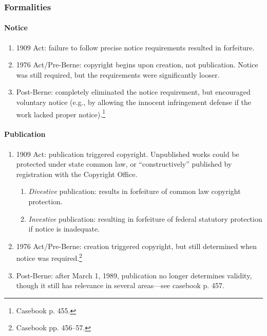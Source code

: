 \subsubsection{Formalities}

\paragraph{Notice}

\begin{enumerate}
    \item 1909 Act: failure to follow precise notice requirements resulted in 
    forfeiture.
    \item 1976 Act/Pre-Berne: copyright begins upon creation, not 
    publication. Notice was still required, but the requirements were 
    significantly looser.
    \item Post-Berne: completely eliminated the notice requirement, but 
    encouraged voluntary notice (e.g., by allowing the innocent infringement 
    defense if the work lacked proper notice).\footnote{Casebook p. 455.}
\end{enumerate}

\paragraph{Publication}

\begin{enumerate}
    \item 1909 Act: publication triggered copyright. Unpublished works could 
    be protected under state common law, or ``constructively'' published by 
    registration with the Copyright Office.
    \begin{enumerate}
        \item \emph{Divestive} publication: results in forfeiture of common 
        law copyright protection. 
        \item \emph{Investive} publication: resulting in forfeiture of federal 
        statutory protection if notice is inadequate.
    \end{enumerate}
    \item 1976 Act/Pre-Berne: creation triggered copyright, but still 
    determined when notice was required.\footnote{Casebook pp. 456--57.}
    \item Post-Berne: after March 1, 1989, publication no longer determines 
    validity, though it still has relevance in several areas---see casebook p. 
    457.
\end{enumerate}

